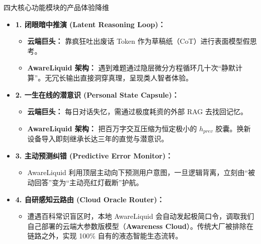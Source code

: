 ﻿\documentclass[aspectratio=169, 10pt]{beamer}
\begin{document}
\begin{frame}{四大核心功能模块的产品体验降维}
\begin{itemize}
    \item \textbf{1. 闭眼暗中推演 (Latent Reasoning Loop)：}
    \begin{itemize}
        \item \textbf{云端巨头：} 靠疯狂吐出废话 Token 作为草稿纸（CoT）进行表面模型假思考。
        \item \textbf{AwareLiquid 架构：} 遇到难题通过隐层微分方程循环几十次“静默计算”。无冗长输出直接洞穿真理，呈现类人智者体验。
    \end{itemize}
    \vspace{0.3em}
    \item \textbf{2. 一生在线的潜意识 (Personal State Capsule)：}
    \begin{itemize}
        \item \textbf{云端巨头：} 每日对话失忆，需通过极度耗资的外部 RAG 去找回记忆。
        \item \textbf{AwareLiquid 架构：} 把百万字交互压缩为恒定极小的 $h_{prev}$ 胶囊。换新设备导入即刻继承长达三年的直觉与潜意识。
    \end{itemize}
    \vspace{0.3em}
    \item \textbf{3. 主动预测纠错 (Predictive Error Monitor)：}
    \begin{itemize}
        \item AwareLiquid 利用顶层主动向下预测用户意图，一旦逻辑背离，立刻由“被动回答”变为“主动亮红灯截断”护航。
    \end{itemize}
    \vspace{0.3em}
    \item \textbf{4. 自研感知云路由 (Cloud Oracle Router)：}
    \begin{itemize}
        \item 遭遇百科常识盲区时，本地 AwareLiquid 会自动发起极简口令，调取我们自己部署的云端大参数版模型（\textbf{Awareness Cloud}）。传统大厂被排除在链路之外，实现 100\% 自有的液态智能生态流转。
    \end{itemize}
\end{itemize}
\end{frame}
\end{document}
